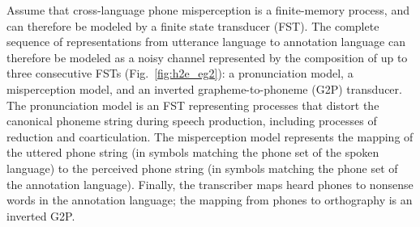 Assume that cross-language phone misperception is a finite-memory
process, and can therefore be modeled by a finite state transducer
(FST).  The complete sequence of representations from utterance
language to annotation language can therefore be modeled as a noisy
channel represented by the composition of up to three consecutive FSTs
(Fig.~\ref{fig:h2e_eg2}): a pronunciation model, a misperception
model, and an inverted grapheme-to-phoneme (G2P) transducer.  The
pronunciation model is an FST representing processes that distort the
canonical phoneme string during speech production, including processes
of reduction and coarticulation.  The misperception model represents
the mapping of the uttered phone string (in symbols matching the
phone set of the spoken language) to the perceived phone string (in
symbols matching the phone set of the annotation language).  Finally,
the transcriber maps heard phones to nonsense words in the annotation
language; the mapping from phones to orthography is an inverted G2P.


